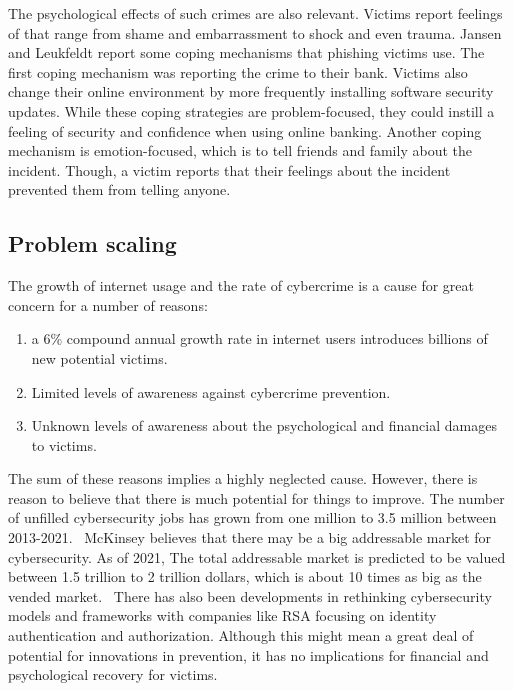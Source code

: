 \documentclass[12pt]{article}
\begin{document}
The psychological effects of such crimes are also relevant. Victims report feelings
of that range from shame and embarrassment to shock and even trauma.
Jansen and Leukfeldt report some coping mechanisms that phishing victims use. The first 
coping mechanism was reporting the crime to their bank. Victims also change their online
environment by more frequently installing software security updates. While these coping
strategies are problem-focused, they could instill a feeling of security and confidence
when using online banking. Another coping mechanism is emotion-focused, which is to
tell friends and family about the incident. Though, a victim reports that their feelings
about the incident prevented them from telling anyone.~\cite{jansen2018coping}

\subsection{Problem scaling}


The growth of internet usage and the rate of cybercrime is a cause for great
concern for a number of reasons:

\begin{enumerate}
    \item a 6\% compound annual growth rate in internet users introduces
    billions of new potential victims.~\cite{StatistaInternetUsers}
    \item Limited levels of awareness against cybercrime prevention.~\cite{enisa-raising-awareness}
    \item Unknown levels of awareness about the psychological and financial
    damages to victims.
\end{enumerate}

The sum of these reasons implies a highly neglected cause. 
However, there is reason to believe that there is much potential 
for things to improve. The number of unfilled cybersecurity jobs has grown
from one million to 3.5 million between 2013-2021.~\cite{cybersecurity-ventures-cybercrime-report}
McKinsey believes that there may be a big addressable market for cybersecurity. As of 2021,
The total addressable market is predicted to be valued between 1.5 trillion to 2 trillion dollars, which
is about 10 times as big as the vended market.~\cite{McKinsey2022Survey} 
There has also been developments in rethinking cybersecurity models and frameworks with
companies like RSA focusing on identity authentication and authorization.
Although this might mean a great deal of potential for innovations in 
prevention, it has no implications for financial and psychological 
recovery for victims.
\end{document}
